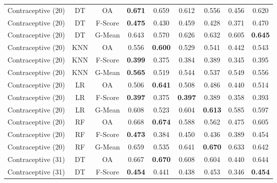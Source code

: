 \begin{longtable}{ccccccccc}
Contraceptive (20) &         DT &      OA & \textbf{0.671} &          0.659 &          0.612 &          0.556 &          0.456 &          0.620 \\
Contraceptive (20) &         DT & F-Score & \textbf{0.475} &          0.430 &          0.459 &          0.428 &          0.371 &          0.470 \\
Contraceptive (20) &         DT &  G-Mean &          0.643 &          0.570 &          0.626 &          0.632 &          0.605 & \textbf{0.645} \\
Contraceptive (20) &        KNN &      OA &          0.556 & \textbf{0.600} &          0.529 &          0.541 &          0.442 &          0.543 \\
Contraceptive (20) &        KNN & F-Score & \textbf{0.399} &          0.375 &          0.384 &          0.389 &          0.345 &          0.395 \\
Contraceptive (20) &        KNN &  G-Mean & \textbf{0.565} &          0.519 &          0.544 &          0.537 &          0.549 &          0.556 \\
Contraceptive (20) &         LR &      OA &          0.506 & \textbf{0.641} &          0.508 &          0.486 &          0.440 &          0.514 \\
Contraceptive (20) &         LR & F-Score & \textbf{0.397} &          0.375 & \textbf{0.397} &          0.389 &          0.358 &          0.393 \\
Contraceptive (20) &         LR &  G-Mean &          0.608 &          0.523 &          0.604 & \textbf{0.613} &          0.585 &          0.597 \\
Contraceptive (20) &         RF &      OA &          0.668 & \textbf{0.674} &          0.588 &          0.562 &          0.475 &          0.605 \\
Contraceptive (20) &         RF & F-Score & \textbf{0.473} &          0.384 &          0.450 &          0.436 &          0.389 &          0.454 \\
Contraceptive (20) &         RF &  G-Mean &          0.659 &          0.535 &          0.641 & \textbf{0.670} &          0.633 &          0.642 \\
Contraceptive (31) &         DT &      OA &          0.667 & \textbf{0.670} &          0.608 &          0.604 &          0.440 &          0.644 \\
Contraceptive (31) &         DT & F-Score & \textbf{0.454} &          0.441 &          0.438 &          0.453 &          0.346 & \textbf{0.454} \\

\end{longtable}
